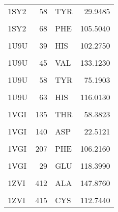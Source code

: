 \begin{table}
\begin{tabular}{lrlr}
			1SY2 & 58 & TYR & 29.9485\\
			\cellcolor{gray!6}{1SY2} & \cellcolor{gray!6}{59} & \cellcolor{gray!6}{HIS} & \cellcolor{gray!6}{126.3700}\\
			1SY2 & 68 & PHE & 105.5040\\
			\cellcolor{gray!6}{1U9U} & \cellcolor{gray!6}{35} & \cellcolor{gray!6}{PHE} & \cellcolor{gray!6}{120.9680}\\
			\addlinespace
			1U9U & 39 & HIS & 102.2750\\
			\cellcolor{gray!6}{1U9U} & \cellcolor{gray!6}{40} & \cellcolor{gray!6}{PRO} & \cellcolor{gray!6}{87.3619}\\
			1U9U & 45 & VAL & 133.1230\\
			\cellcolor{gray!6}{1U9U} & \cellcolor{gray!6}{46} & \cellcolor{gray!6}{LEU} & \cellcolor{gray!6}{99.9911}\\
			1U9U & 58 & TYR & 75.1903\\
			\addlinespace
			\cellcolor{gray!6}{1U9U} & \cellcolor{gray!6}{61} & \cellcolor{gray!6}{VAL} & \cellcolor{gray!6}{152.2510}\\
			1U9U & 63 & HIS & 116.0130\\
			\cellcolor{gray!6}{1U9U} & \cellcolor{gray!6}{67} & \cellcolor{gray!6}{ALA} & \cellcolor{gray!6}{136.6100}\\
			1VGI & 135 & THR & 58.3823\\
			\cellcolor{gray!6}{1VGI} & \cellcolor{gray!6}{138} & \cellcolor{gray!6}{LEU} & \cellcolor{gray!6}{81.0454}\\
			\addlinespace
			1VGI & 140 & ASP & 22.5121\\
			\cellcolor{gray!6}{1VGI} & \cellcolor{gray!6}{142} & \cellcolor{gray!6}{SER} & \cellcolor{gray!6}{125.4790}\\
			1VGI & 207 & PHE & 106.2160\\
			\cellcolor{gray!6}{1VGI} & \cellcolor{gray!6}{25} & \cellcolor{gray!6}{HIS} & \cellcolor{gray!6}{113.1630}\\
			1VGI & 29 & GLU & 118.3990\\
			\addlinespace
			\cellcolor{gray!6}{1ZVI} & \cellcolor{gray!6}{409} & \cellcolor{gray!6}{TRP} & \cellcolor{gray!6}{90.9270}\\
			1ZVI & 412 & ALA & 147.8760\\
			\cellcolor{gray!6}{1ZVI} & \cellcolor{gray!6}{414} & \cellcolor{gray!6}{ARG} & \cellcolor{gray!6}{71.6516}\\
			1ZVI & 415 & CYS & 112.7440\\

\end{tabular}
\end{table}
